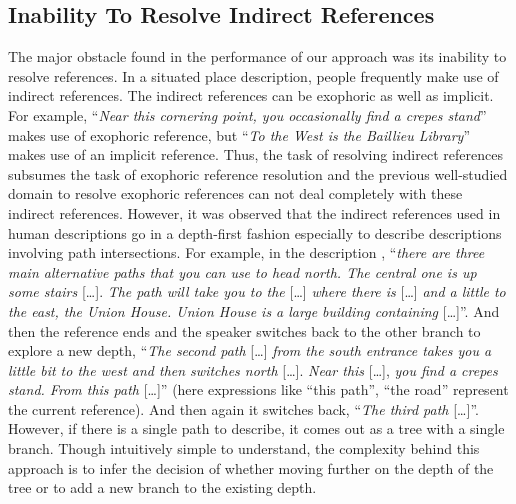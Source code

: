 \documentclass[letter]{sig-alternate}
\begin{document}
\subsection{Inability To Resolve Indirect References}
The major obstacle found in the performance of our approach was its inability to resolve references. 
In a situated place description, people frequently make use of indirect references. The
indirect references can be exophoric as well as implicit. For example, ``\textit{Near this cornering point, you occasionally find a crepes stand}''
 makes use of exophoric reference, but ``\textit{To the West is the Baillieu Library}'' makes use of an implicit reference. Thus,
the task of resolving indirect references subsumes the task of exophoric reference resolution and
the previous well-studied domain to resolve exophoric references can not deal completely with these indirect references.
However, it was observed that the indirect references used in human descriptions go in a
depth-first fashion especially to describe descriptions involving path intersections. 
For example, in the description , ``\textit{there are three main
alternative paths that you can use to head north. The central one is up
some stairs} {[}\dots{]}. \textit{The path will take you to the} {[}\dots{]} \textit{where there
is} {[}\dots{]} \textit{and a little to the east, the Union House. Union House is a
large building containing} {[}\dots{]}''. And then the reference ends and the
speaker switches back to the other branch to explore a new depth,
``\textit{The second path} {[}\dots{]} \textit{from the south entrance takes you a little
bit to the west and then switches north} {[}\dots{]}. \textit{Near this} {[}\dots{]},
\textit{you find a crepes stand. From this path }{[}\dots{]}'' (here expressions like
``this path'', ``the road'' represent the current reference). And then
again it switches back, ``\textit{The third path} {[}\dots{]}''.
However, if there is a single path to describe, it comes out as a tree with a single branch.
Though intuitively simple to understand, the complexity behind this approach is to infer the decision of whether moving further on the depth
of the tree or to add a new branch to the existing depth.\cite{me}
\end{document}
